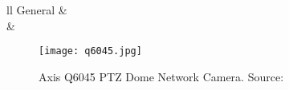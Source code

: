 \begin{table}[ht]
\begin{tabular}{ll}
General                                                 &                                                                                                                                                                                        \\ \hline
{}              &                                                                            \\ \hline
\end{tabular}
\end{table}

\begin{figure}[ht]
    \centering
    \texttt{[image: q6045.jpg]}
    \caption{Axis Q6045 PTZ Dome Network Camera. Source:\cite{AxisCam}}
    \label{fig:q6045_cam}
\end{figure}
